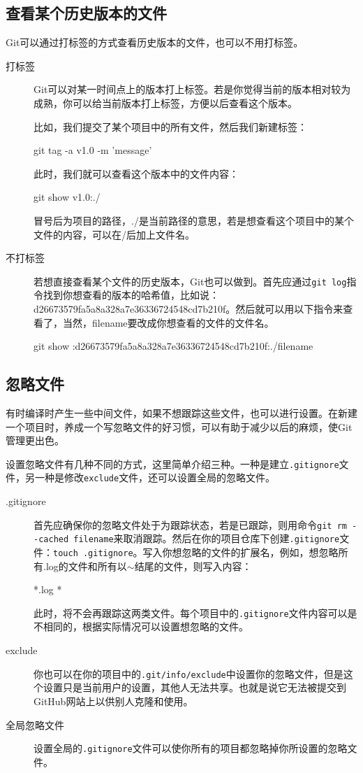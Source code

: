 \documentclass[a4paper,12pt]{article}
\begin{document}
\subsection{查看某个历史版本的文件}
Git可以通过打标签的方式查看历史版本的文件，也可以不用打标签。
\begin{description}
\item [打标签]
Git可以对某一时间点上的版本打上标签。若是你觉得当前的版本相对较为成熟，你可以给当前版本打上标签，方便以后查看这个版本。

比如，我们提交了某个项目中的所有文件，然后我们新建标签：
\begin{bash}
git tag -a v1.0 -m 'message'
\end{bash}
此时，我们就可以查看这个版本中的文件内容：
\begin{bash}
git show v1.0:./
\end{bash}
冒号后为项目的路径，./是当前路径的意思，若是想查看这个项目中的某个文件的内容，可以在/后加上文件名。
\item[不打标签]
若想直接查看某个文件的历史版本，Git也可以做到。首先应通过\lstinline|git log|指令找到你想查看的版本的哈希值，比如说： d26673579fa5a8a328a7e36336724548cd7b210f。然后就可以用以下指令来查看了，当然，filename要改成你想查看的文件的文件名。
\begin{bash}
git show :d26673579fa5a8a328a7e36336724548cd7b210f:./filename
\end{bash}
\end{description}
\subsection{忽略文件}

有时编译时产生一些中间文件，如果不想跟踪这些文件，也可以进行设置\cite{5:misc}。在新建一个项目时，养成一个写忽略文件的好习惯，可以有助于减少以后的麻烦，使Git管理更出色。

设置忽略文件有几种不同的方式，这里简单介绍三种。一种是建立\verb|.gitignore|文件，另一种是修改\verb|exclude|文件，还可以设置全局的忽略文件。
\begin{description}
\item[.gitignore] 首先应确保你的忽略文件处于为跟踪状态，若是已跟踪，则用命令\lstinline|git rm --cached filename|来取消跟踪。然后在你的项目仓库下创建\verb|.gitignore|文件：\lstinline|touch .gitignore|。写入你想忽略的文件的扩展名，例如，想忽略所有.log的文件和所有以$\sim$结尾的文件，则写入内容：
\begin{plaintext}
*.log
*~
\end{plaintext}

此时，将不会再跟踪这两类文件。每个项目中的\verb|.gitignore|文件内容可以是不相同的，根据实际情况可以设置想忽略的文件。
\item[exclude] 你也可以在你的项目中的\verb|.git/info/exclude|中设置你的忽略文件，但是这个设置只是当前用户的设置，其他人无法共享。也就是说它无法被提交到GitHub网站上以供别人克隆和使用。
\item[全局忽略文件] 设置全局的\verb|.gitignore|文件可以使你所有的项目都忽略掉你所设置的忽略文件。
\end{description}
\end{document}
